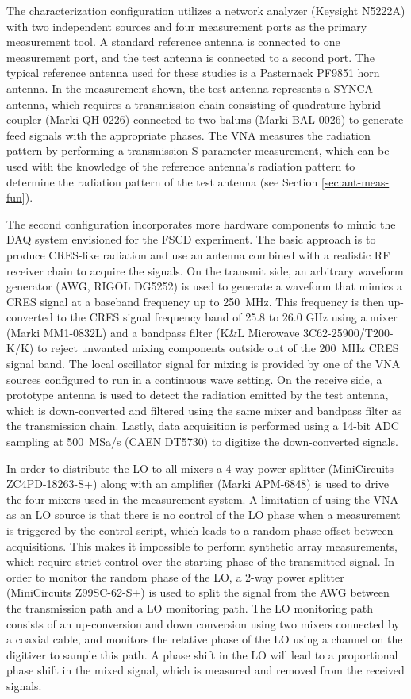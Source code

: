 The characterization configuration utilizes a network analyzer (Keysight N5222A) with two independent sources and four measurement ports as the primary measurement tool. A standard reference antenna is connected to one measurement port, and the test antenna is connected to a second port. The typical reference antenna used for these studies is a Pasternack PF9851 horn antenna. In the measurement shown, the test antenna represents a SYNCA antenna, which requires a transmission chain consisting of quadrature hybrid coupler (Marki QH-0226) connected to two baluns (Marki BAL-0026) to generate feed signals with the appropriate phases. The VNA measures the radiation pattern by performing a transmission S-parameter measurement, which can be used with the knowledge of the reference antenna's radiation pattern to determine the radiation pattern of the test antenna (see Section \ref{sec:ant-meas-fun}).

The second configuration incorporates more hardware components to mimic the DAQ system envisioned for the FSCD experiment. The basic approach is to produce CRES-like radiation and use an antenna combined with a realistic RF receiver chain to acquire the signals. On the transmit side, an arbitrary waveform generator (AWG, RIGOL DG5252) is used to generate a waveform that mimics a CRES signal at a baseband frequency up to 250~MHz. This frequency is then up-converted to the CRES signal frequency band of 25.8 to 26.0 GHz using a mixer (Marki MM1-0832L) and a bandpass filter (K\&L Microwave 3C62-25900/T200-K/K) to reject unwanted mixing components outside out of the 200~MHz CRES signal band. The local oscillator signal for mixing is provided by one of the VNA sources configured to run in a continuous wave setting. On the receive side, a prototype antenna is used to detect the radiation emitted by the test antenna, which is down-converted and filtered using the same mixer and bandpass filter as the transmission chain. Lastly, data acquisition is performed using a 14-bit ADC sampling at 500~MSa/s (CAEN DT5730) to digitize the down-converted signals.

In order to distribute the LO to all mixers a 4-way power splitter (MiniCircuits ZC4PD-18263-S+) along with an amplifier (Marki APM-6848) is used to drive the four mixers used in the measurement system. A limitation of using the VNA as an LO source is that there is no control of the LO phase when a measurement is triggered by the control script, which leads to a random phase offset between acquisitions. This makes it impossible to perform synthetic array measurements, which require strict control over the starting phase of the transmitted signal. In order to monitor the random phase of the LO, a 2-way power splitter (MiniCircuits Z99SC-62-S+) is used to split the signal from the AWG between the transmission path and a LO monitoring path. The LO monitoring path consists of an up-conversion and down conversion using two mixers connected by a coaxial cable, and monitors the relative phase of the LO using a channel on the digitizer to sample this path. A phase shift in the LO will lead to a proportional phase shift in the mixed signal, which is measured and removed from the received signals.

